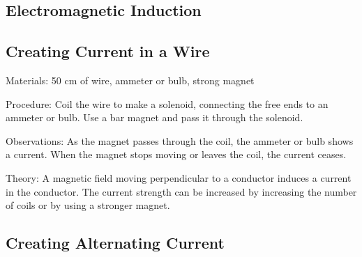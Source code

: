 \begin{multicols}{2}

\section*{Electromagnetic Induction}


\subsection{Creating Current in a Wire} %


\begin{description*}
\item[Materials:]{50 cm of wire, ammeter or bulb, strong magnet}
\item[Procedure:]{Coil the wire to make a solenoid, connecting the free ends to an ammeter or bulb. Use a bar magnet and pass it through the solenoid.}
\item[Observations:]{As the magnet passes through the coil, the ammeter or bulb shows a current. When the magnet stops moving or leaves the coil, the current ceases.}
\item[Theory:]{A magnetic field moving perpendicular to a conductor induces a current in the conductor. The current strength can be increased by increasing the number of coils or by using a stronger magnet.}
\end{description*}

\subsection{Creating Alternating Current}



\end{multicols}
